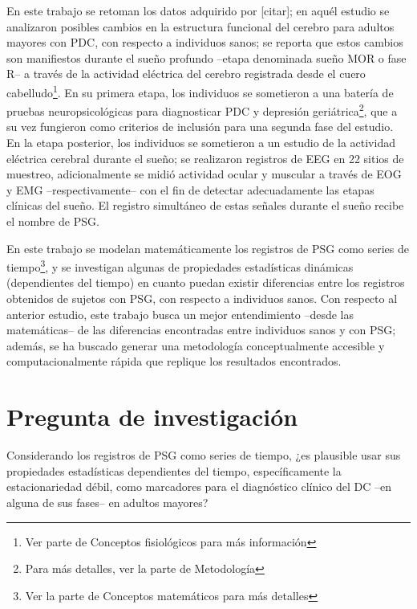 En este trabajo se retoman los datos adquirido por [citar]; en aqu\'el estudio se analizaron
posibles cambios en la estructura funcional del cerebro para adultos mayores con PDC, con 
respecto a individuos sanos; se reporta que estos cambios son manifiestos durante el sue\~no
profundo --etapa denominada sue\~no MOR o fase R-- 
a trav\'es de la actividad el\'ectrica del cerebro registrada desde el cuero 
cabelludo\footnote{Ver parte de Conceptos fisiol\'ogicos para m\'as informaci\'on}. 
En su primera etapa,
los individuos se sometieron a una bater\'ia de pruebas
neuropsicol\'ogicas para diagnosticar PDC y depresi\'on geri\'atrica\footnote{Para
m\'as detalles, ver la parte de Metodolog\'ia}, que a su vez fungieron como criterios de
inclusi\'on para una segunda fase del estudio.
En la etapa posterior, los individuos se sometieron a un estudio de la
actividad el\'ectrica cerebral durante el
sue\~no; se realizaron
registros de EEG en 22 sitios de muestreo, adicionalmente se midi\'o
actividad ocular y muscular a trav\'es de EOG y EMG --respectivamente-- con
el fin de detectar adecuadamente las etapas cl\'inicas del sue\~no\cite{AASM07}.
El registro simult\'aneo de estas se\~nales durante el sue\~no recibe el nombre de PSG.

En este trabajo se modelan matem\'aticamente los registros de PSG como series de 
tiempo\footnote{Ver la parte de Conceptos matem\'aticos para m\'as detalles}, y se
investigan algunas de propiedades estad\'isticas din\'amicas (dependientes del tiempo)
en cuanto puedan existir diferencias entre los registros obtenidos de sujetos con PSG,
con respecto a individuos sanos. 
Con respecto al anterior estudio, este trabajo busca un mejor
entendimiento --desde las matem\'aticas-- de las diferencias encontradas entre 
individuos sanos y con PSG; adem\'as, se ha buscado generar una metodolog\'ia 
conceptualmente accesible y computacionalmente r\'apida que replique los resultados encontrados.


\section{Pregunta de investigaci\'on}

Considerando los registros de PSG como series de tiempo,
¿es plausible usar sus propiedades estad\'isticas dependientes del tiempo, espec\'ificamente
la estacionariedad d\'ebil,
como marcadores para el diagn\'ostico cl\'inico del DC --en alguna de 
sus fases-- en adultos mayores?

